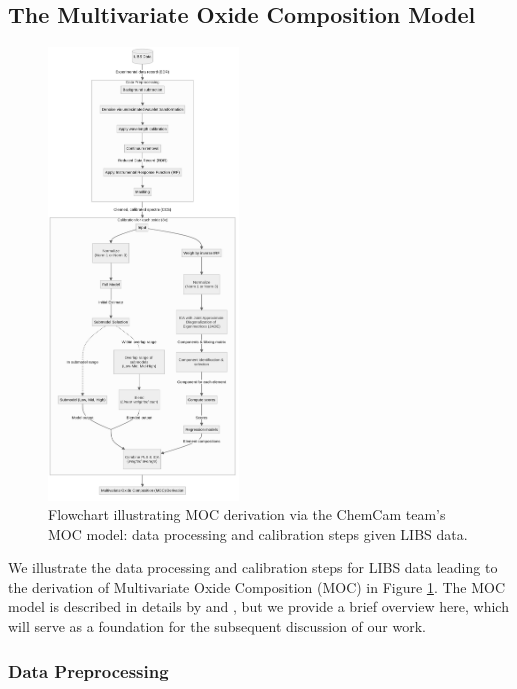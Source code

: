 \subsection{The Multivariate Oxide Composition Model}\label{sec:moc}
\begin{figure}[ht]
    \centering
    \includegraphics[width=0.45\textwidth]{images/pipeline.png}
    \caption{Flowchart illustrating MOC derivation via the ChemCam team's MOC model: data processing and calibration steps given LIBS data.}
    \label{fig:libs_data_processing}
\end{figure}

We illustrate the data processing and calibration steps for LIBS data leading to the derivation of Multivariate Oxide Composition (MOC) in Figure \ref{fig:libs_data_processing}. The MOC model is described in details by \citet{cleggRecalibrationMarsScience2017} and \citet{andersonImprovedAccuracyQuantitative2017}, but we provide a brief overview here, which will serve as a foundation for the subsequent discussion of our work.

\subsubsection{Data Preprocessing}\label{sec:data_preprocessing}


